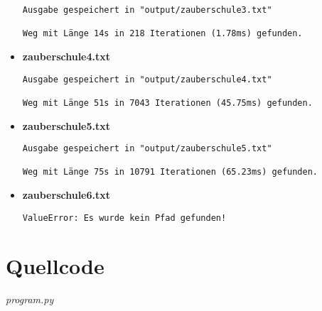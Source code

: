 \documentclass[a4paper,12pt]{scrartcl}
\theoremstyle{definition}
\begin{document}
\begin{itemize}
\begin{verbatim}
Ausgabe gespeichert in "output/zauberschule3.txt"

Weg mit Länge 14s in 218 Iterationen (1.78ms) gefunden.
	\end{verbatim}
	\item \textbf{zauberschule4.txt}\begin{verbatim}
Ausgabe gespeichert in "output/zauberschule4.txt"

Weg mit Länge 51s in 7043 Iterationen (45.75ms) gefunden.
	\end{verbatim}
	\item \textbf{zauberschule5.txt}\begin{verbatim}
Ausgabe gespeichert in "output/zauberschule5.txt"

Weg mit Länge 75s in 10791 Iterationen (65.23ms) gefunden.
			\end{verbatim}
	\item \textbf{zauberschule6.txt}\begin{verbatim}
ValueError: Es wurde kein Pfad gefunden!
			\end{verbatim}
\end{itemize}

\section{Quellcode}

\textit{program.py}
\inputminted[breaklines,linenos,fontsize=\footnotesize]{python3}{program.py}
\newpage
\end{document}
